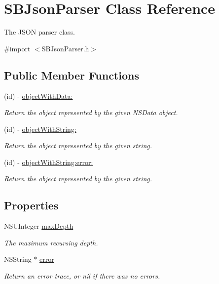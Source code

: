 \hypertarget{interface_s_b_json_parser}{
\section{SBJsonParser Class Reference}
\label{interface_s_b_json_parser}
}


The JSON parser class.  




{\ttfamily \#import $<$SBJsonParser.h$>$}

\subsection*{Public Member Functions}
\begin{DoxyCompactItemize}
\item 
(id) -\/ \hyperlink{interface_s_b_json_parser_a66d7be591cdf0d9ee85c21c863ef5cbf}{objectWithData:}
\begin{DoxyCompactList}\small\item\em Return the object represented by the given NSData object. \item\end{DoxyCompactList}\item 
(id) -\/ \hyperlink{interface_s_b_json_parser_a1ec40b986576044d58d30172b141c74c}{objectWithString:}
\begin{DoxyCompactList}\small\item\em Return the object represented by the given string. \item\end{DoxyCompactList}\item 
(id) -\/ \hyperlink{interface_s_b_json_parser_a7a7fff47f41a08fa0defc4f628846e15}{objectWithString:error:}
\begin{DoxyCompactList}\small\item\em Return the object represented by the given string. \item\end{DoxyCompactList}\end{DoxyCompactItemize}
\subsection*{Properties}
\begin{DoxyCompactItemize}
\item 
NSUInteger \hyperlink{interface_s_b_json_parser_a0378b4ce99a1caeddc4a05da37ca4ffa}{maxDepth}
\begin{DoxyCompactList}\small\item\em The maximum recursing depth. \item\end{DoxyCompactList}\item 
NSString $\ast$ \hyperlink{interface_s_b_json_parser_ab9b74d7c752a03042edb78beeafaa6ce}{error}
\begin{DoxyCompactList}\small\item\em Return an error trace, or nil if there was no errors. \item\end{DoxyCompactList}\end{DoxyCompactItemize}


